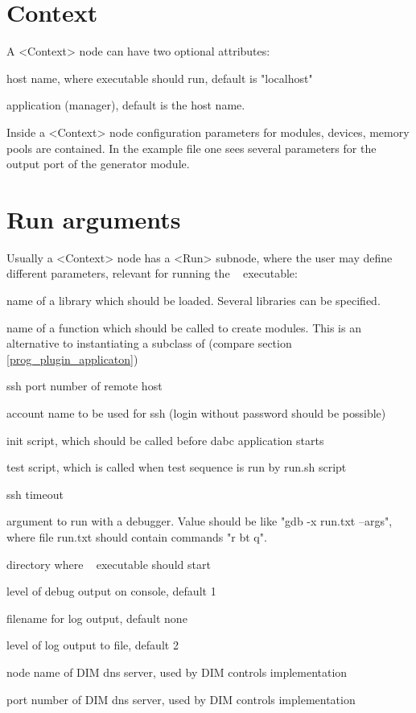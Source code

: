 \section{Context}
\label{prog_setup_configfile_context}
A <Context> node can have two optional attributes:
\bdes
\item["host"] host name, where executable should run, default is "localhost"
\item["name"] application (manager), default is the host name.
\edes

Inside a <Context> node configuration parameters for modules, devices, memory pools are
contained.
In the example file one sees several parameters for the output port of 
the generator module.  


\section{Run arguments}
\label{prog_setup_configfile_run}
Usually a <Context> node has a <Run> subnode, where the user may define different parameters, relevant for running the \dabc~ executable:

\bdes
\item[lib] name of a library which should be loaded. Several libraries can be specified.
\item[func] name of a function which should be called to create modules. 
This is an alternative to instantiating a subclass of  
(compare section \ref{prog_plugin_applicaton})
\item[port] ssh port number of remote host
\item[user] account name to be used for ssh (login without password should be possible)
\item[init] init script, which should be called before dabc application starts
\item[test] test script, which is called when test sequence is run by run.sh script
\item[timeout] ssh timeout 
\item[debugger] argument to run with a debugger. Value should be like "gdb -x run.txt --args", where file run.txt should contain commands "r bt q".
\item[workdir] directory where \dabc~ executable should start
\item[debuglevel] level of debug output on console, default 1
\item[logfile] filename for log output, default none  
\item[loglevel] level of log output to file, default 2 
\item[DIM\_DNS\_NODE] node name of DIM dns server, used by DIM controls implementation 
\item[DIM\_DNS\_PORT] port number of DIM dns server, used by DIM controls implementation
\edes


